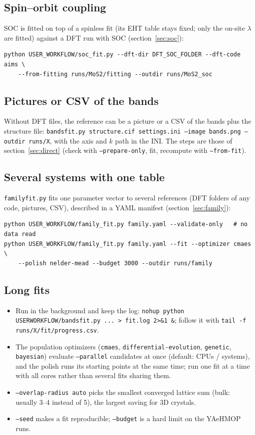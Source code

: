 \documentclass[11pt,a4paper]{article}
\newcommand{\cmd}[1]{\texttt{#1}}
\renewcommand{\_}{\origunderscore\allowbreak}
\begin{document}
\subsection{Spin--orbit coupling}
SOC is fitted on top of a spinless fit (its EHT table stays fixed; only the on-site $\lambda$ are fitted) against a DFT run with
SOC (section~\ref{sec:soc}):
\begin{lstlisting}[style=sh]
python USER_WORKFLOW/soc_fit.py --dft-dir DFT_SOC_FOLDER --dft-code aims \
    --from-fitting runs/MoS2/fitting --outdir runs/MoS2_soc
\end{lstlisting}

\subsection{Pictures or CSV of the bands}
Without DFT files, the reference can be a picture or a CSV of the bands plus the structure file:
\cmd{bands\_fit.py structure.cif settings.ini --image bands.png --outdir runs/X}, with the axis and $k$ path in the INI. The
steps are those of section~\ref{sec:direct} (check with \cmd{--prepare-only}, fit, recompute with \cmd{--from-fit}).

\subsection{Several systems with one table}
\cmd{family\_fit.py} fits one parameter vector to several references (DFT folders of any code, pictures, CSV), described in a
YAML manifest (section~\ref{sec:family}):
\begin{lstlisting}[style=sh]
python USER_WORKFLOW/family_fit.py family.yaml --validate-only   # no data read
python USER_WORKFLOW/family_fit.py family.yaml --fit --optimizer cmaes \
    --polish nelder-mead --budget 3000 --outdir runs/family
\end{lstlisting}

\subsection{Long fits}
\begin{itemize}[nosep]
\item Run in the background and keep the log: \cmd{nohup python USER\_WORKFLOW/bands\_fit.py ... > fit.log 2>\&1 \&};
  follow it with \cmd{tail -f runs/X/fit/progress.csv}.
\item The population optimizers (\cmd{cmaes}, \cmd{differential-evolution}, \cmd{genetic}, \cmd{bayesian}) evaluate
  \cmd{--parallel} candidates at once (default: CPUs / systems), and the polish runs its starting points at the same time; run one
  fit at a time with all cores rather than several fits sharing them.
\item \cmd{--overlap-radius auto} picks the smallest converged lattice sum (bulk: usually 3--4 instead of 5), the largest
  saving for 3D crystals.
\item \cmd{--seed} makes a fit reproducible; \cmd{--budget} is a hard limit on the YAeHMOP runs.
\end{itemize}
\end{document}
